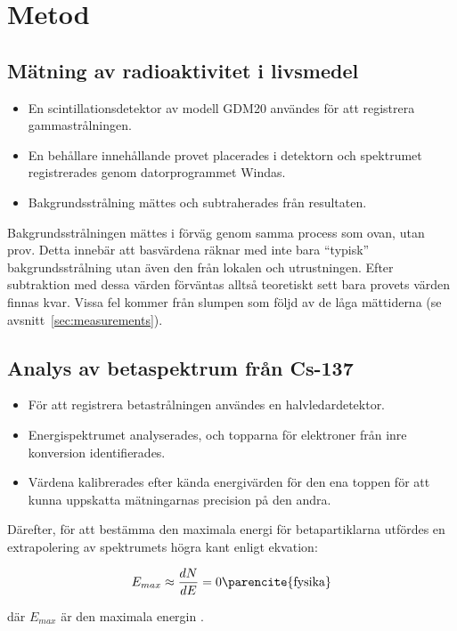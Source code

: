 \section{Metod} \label{sec:method}

\subsection{Mätning av radioaktivitet i livsmedel}

\begin{itemize}
    \item En scintillationsdetektor av modell GDM20 användes för att registrera
    gammastrålningen.

    \item En behållare innehållande provet placerades i detektorn och
    spektrumet registrerades genom datorprogrammet Windas.

    \item Bakgrundsstrålning mättes och subtraherades från resultaten.
\end{itemize}

Bakgrundsstrålningen mättes i förväg genom samma process som ovan, utan prov.
Detta innebär att basvärdena räknar med inte bara ``typisk'' bakgrundsstrålning
utan även den från lokalen och utrustningen. Efter subtraktion med dessa värden
förväntas alltså teoretiskt sett bara provets värden finnas kvar. Vissa fel
kommer från slumpen som följd av de låga mättiderna (se
avsnitt~\ref{sec:measurements}).

\subsection{Analys av betaspektrum från Cs-137}

\begin{itemize}
    \item För att registrera betastrålningen användes en halvledardetektor.

    \item Energispektrumet analyserades, och topparna för elektroner från inre 
    konversion identifierades.

    \item Värdena kalibrerades efter kända energivärden för den ena toppen för
    att kunna uppskatta mätningarnas precision på den andra.
\end{itemize}


Därefter, för att bestämma den maximala energi för betapartiklarna utfördes en extrapolering av spektrumets högra kant enligt ekvation:

\begin{equation}
E_{max} \approx \frac{dN}{dE} = 0 \text{\parencite{fysika}}
\end{equation}

där $E_{max}$ är den maximala energin \parencite{yf}.
